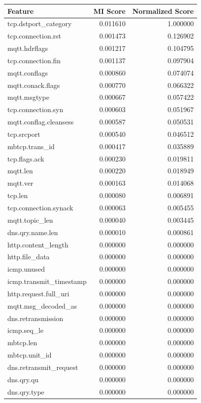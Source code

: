 \documentclass{article}
\begin{document}
\begin{longtable}{lrr}
\toprule
Feature & MI Score & Normalized Score \\
\midrule
tcp.dstport_category & 0.011610 & 1.000000 \\
tcp.connection.rst & 0.001473 & 0.126902 \\
mqtt.hdrflags & 0.001217 & 0.104795 \\
tcp.connection.fin & 0.001137 & 0.097904 \\
mqtt.conflags & 0.000860 & 0.074074 \\
mqtt.conack.flags & 0.000770 & 0.066322 \\
mqtt.msgtype & 0.000667 & 0.057422 \\
tcp.connection.syn & 0.000603 & 0.051967 \\
mqtt.conflag.cleansess & 0.000587 & 0.050531 \\
tcp.srcport & 0.000540 & 0.046512 \\
mbtcp.trans_id & 0.000417 & 0.035889 \\
tcp.flags.ack & 0.000230 & 0.019811 \\
mqtt.len & 0.000220 & 0.018949 \\
mqtt.ver & 0.000163 & 0.014068 \\
tcp.len & 0.000080 & 0.006891 \\
tcp.connection.synack & 0.000063 & 0.005455 \\
mqtt.topic_len & 0.000040 & 0.003445 \\
dns.qry.name.len & 0.000010 & 0.000861 \\
http.content_length & 0.000000 & 0.000000 \\
http.file_data & 0.000000 & 0.000000 \\
icmp.unused & 0.000000 & 0.000000 \\
icmp.transmit_timestamp & 0.000000 & 0.000000 \\
http.request.full_uri & 0.000000 & 0.000000 \\
mqtt.msg_decoded_as & 0.000000 & 0.000000 \\
dns.retransmission & 0.000000 & 0.000000 \\
icmp.seq_le & 0.000000 & 0.000000 \\
mbtcp.len & 0.000000 & 0.000000 \\
mbtcp.unit_id & 0.000000 & 0.000000 \\
dns.retransmit_request & 0.000000 & 0.000000 \\
dns.qry.qu & 0.000000 & 0.000000 \\
dns.qry.type & 0.000000 & 0.000000 \\

\end{longtable}
\end{document}
